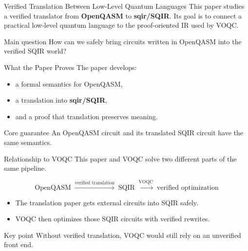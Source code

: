 \documentclass[aspectratio=169]{beamer}
\begin{document}
\begin{frame}{Verified Translation Between Low-Level Quantum Languages}
\justifying
This paper studies a verified translator from \textbf{OpenQASM} to \textbf{sqir/SQIR}.  
Its goal is to connect a practical low-level quantum language to the proof-oriented IR used by VOQC. 

\vspace{0.7em}
\begin{block}{Main question}
How can we safely bring circuits written in OpenQASM into the verified SQIR world?
\end{block}
\end{frame}
\begin{frame}{What the Paper Proves}
\justifying
The paper develops:
\begin{itemize}
    \item a formal semantics for OpenQASM,
    \item a translation into \textbf{sqir/SQIR},
    \item and a proof that translation preserves meaning.
\end{itemize}

\vspace{0.7em}
\begin{block}{Core guarantee}
An OpenQASM circuit and its translated SQIR circuit have the same semantics.
\end{block}
\end{frame}
\begin{frame}{Relationship to VOQC}
\justifying
This paper and VOQC solve two different parts of the same pipeline.

\vspace{0.7em}
\[
\text{OpenQASM}
\;\xrightarrow{\text{verified translation}}\;
\text{SQIR}
\;\xrightarrow{\text{VOQC}}\;
\text{verified optimization}
\]

\vspace{0.7em}
\begin{itemize}
    \item The translation paper gets external circuits into SQIR safely.
    \item VOQC then optimizes those SQIR circuits with verified rewrites.
\end{itemize}

\vspace{0.7em}
\begin{alertblock}{Key point}
Without verified translation, VOQC would still rely on an unverified front end.
\end{alertblock}
\end{frame}
\end{document}
